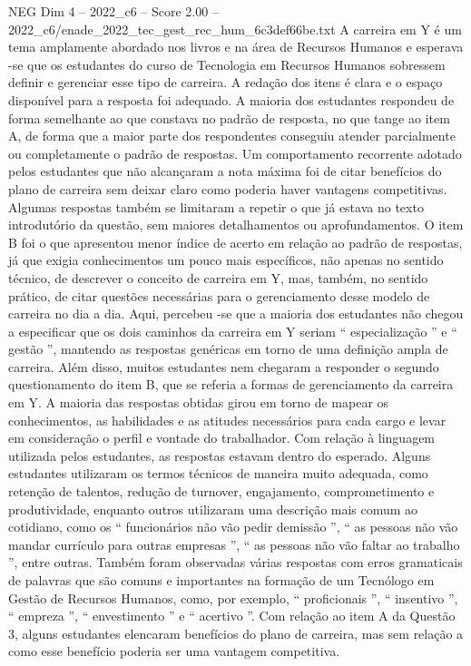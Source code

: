 \begin{textsample}{NEG Dim 4 – 2022\_c6 – Score 2.00 – 2022\_c6/enade\_2022\_tec\_gest\_rec\_hum\_6c3def66be.txt}
A carreira em Y é um tema amplamente abordado nos livros e na área de Recursos Humanos e esperava -se que os estudantes do curso de Tecnologia em Recursos Humanos sobressem definir e gerenciar esse tipo de carreira.
A redação dos itens é clara e o espaço disponível para a resposta foi adequado.
A maioria dos estudantes respondeu de forma semelhante ao que constava no padrão de resposta, no que tange ao item A, de forma que a maior parte dos respondentes conseguiu atender parcialmente ou completamente o padrão de respostas.
Um comportamento recorrente adotado pelos estudantes que não alcançaram a nota máxima foi de citar benefícios do plano de carreira sem deixar claro como poderia haver vantagens competitivas.
Algumas respostas também se limitaram a repetir o que já estava no texto introdutório da questão, sem maiores detalhamentos ou aprofundamentos.
O item B foi o que apresentou menor índice de acerto em relação ao padrão de respostas, já que exigia conhecimentos um pouco mais específicos, não apenas no sentido técnico, de descrever o conceito de carreira em Y, mas, também, no sentido prático, de citar questões necessárias para o gerenciamento desse modelo de carreira no dia a dia.
Aqui, percebeu -se que a maioria dos estudantes não chegou a especificar que os dois caminhos da carreira em Y seriam “ especialização ” e “ gestão ”, mantendo as respostas genéricas em torno de uma definição ampla de carreira.
Além disso, muitos estudantes nem chegaram a responder o segundo questionamento do item B, que se referia a formas de gerenciamento da carreira em Y.
A maioria das respostas obtidas girou em torno de mapear os conhecimentos, as habilidades e as atitudes necessários para cada cargo e levar em consideração o perfil e vontade do trabalhador.
Com relação à linguagem utilizada pelos estudantes, as respostas estavam dentro do esperado.
Alguns estudantes utilizaram os termos técnicos de maneira muito adequada, como retenção de talentos, redução de turnover, engajamento, comprometimento e produtividade, enquanto outros utilizaram uma descrição mais comum ao cotidiano, como os “ funcionários não vão pedir demissão ”, “ as pessoas não vão mandar currículo para outras empresas ”, “ as pessoas não vão faltar ao trabalho ”, entre outras.
Também foram observadas várias respostas com erros gramaticais de palavras que são comuns e importantes na formação de um Tecnólogo em Gestão de Recursos Humanos, como, por exemplo, “ proficionais ”, “ insentivo ”, “ empreza ”, “ envestimento ” e “ acertivo ”.
Com relação ao item A da Questão 3, alguns estudantes elencaram benefícios do plano de carreira, mas sem relação a como esse benefício poderia ser uma vantagem competitiva.

\end{textsample}
